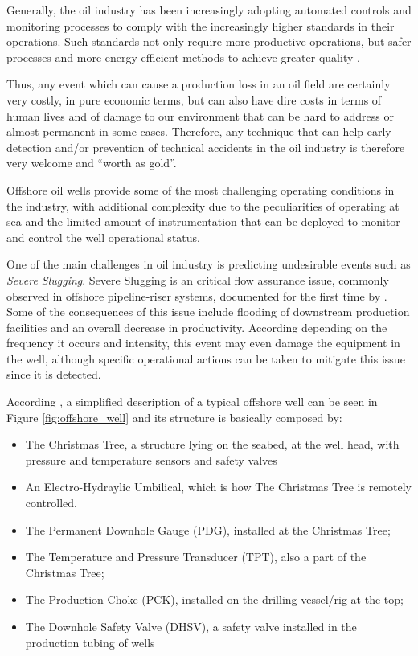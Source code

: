 \documentclass{article}
\begin{document}
Generally, the oil industry has been increasingly adopting automated controls and monitoring processes \parencite{venkatasubramanian_rengaswamy_yin_kavuri_2003} to comply with the increasingly higher standards in their operations. Such standards not only require more productive operations, but safer processes and more energy-efficient methods to achieve greater quality \parencite{jounela_2007}.

Thus, any event which can cause a production loss in an oil field are certainly very costly, in pure economic terms, but can also have dire costs in terms of human lives and of damage to our environment that can be hard to address or almost permanent in some cases. Therefore, any technique that can help early detection and/or prevention of technical accidents in the oil industry is therefore very welcome and “worth as gold”. 

Offshore oil wells provide some of the most challenging operating conditions in the industry, with additional complexity due to the peculiarities of operating at sea and the limited amount of instrumentation that can be deployed to monitor and control the well operational status.

One of the main challenges in oil industry is predicting undesirable events such as \emph{Severe Slugging}. Severe Slugging is an critical flow assurance issue, commonly observed in offshore pipeline-riser systems, documented for the first time by \textcite{yocum_1973}. Some of the consequences of this issue include flooding of downstream production facilities and an overall decrease in productivity. According \textcite{revvargas2019} depending on the frequency it occurs and intensity, this event may even damage the equipment in the well, although specific operational actions can be taken to mitigate this issue since it is detected.

According \textcite{revvargas2019}, a simplified description of a typical offshore well can be seen in Figure \ref{fig:offshore_well} and its structure is basically composed by:

\begin{itemize}
\item The Christmas Tree, a structure lying on the seabed, at the well head, with pressure and temperature sensors and safety valves
\item An Electro-Hydraylic Umbilical, which is how The Christmas Tree is remotely controlled.
\item The Permanent Downhole Gauge (PDG), installed at the Christmas Tree;
\item The Temperature and Pressure Transducer (TPT), also a part of the Christmas Tree;
\item The Production Choke (PCK), installed on the drilling vessel/rig at the top;
\item The Downhole Safety Valve (DHSV), a safety valve installed in the production tubing of wells
\end{itemize}
\end{document}

